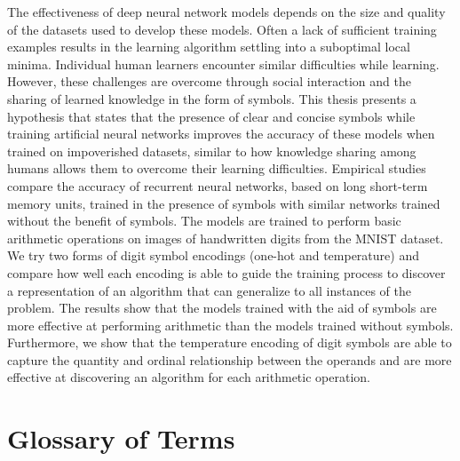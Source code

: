 The effectiveness of deep neural network models depends on the size and quality of the datasets used to develop these models. Often a lack of sufficient training examples results in the learning algorithm settling into a suboptimal local minima. Individual human learners encounter similar difficulties while learning. However, these challenges are overcome through social interaction and the sharing of learned knowledge in the form of symbols. This thesis presents a hypothesis that states that the presence of clear and concise symbols while training artificial neural networks improves the accuracy of these models when trained on impoverished datasets, similar to how knowledge sharing among humans allows them to overcome their learning difficulties. Empirical studies compare the accuracy of recurrent neural networks, based on long short-term memory units, trained in the presence of symbols with similar networks trained without the benefit of symbols. The models are trained to perform basic arithmetic operations on images of handwritten digits from the MNIST dataset. We try two forms of digit symbol encodings (one-hot and temperature) and compare how well each encoding is able to guide the training process to discover a representation of an algorithm that can generalize to all instances of the problem. The results show that the models trained with the aid of symbols are more effective at performing arithmetic than the models trained without symbols. Furthermore, we show that the temperature encoding of digit symbols are able to capture the quantity and ordinal relationship between the operands and are more effective at discovering an algorithm for each arithmetic operation.


{\let\cleardoublepage\clearpage\chapter*{Glossary of Terms}}

